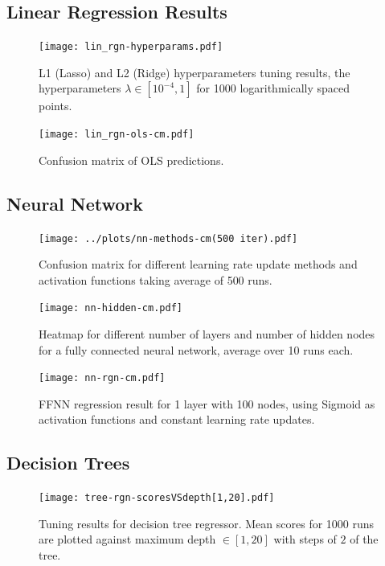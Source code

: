 \documentclass[english,notitlepage,reprint,nofootinbib]{revtex4-1}
\begin{document}
\subsection{Linear Regression Results}

\begin{figure}[H]
	\centering
	\texttt{[image: lin\_rgn-hyperparams.pdf]}
	\caption{L1 (Lasso) and L2 (Ridge) hyperparameters tuning results, the hyperparameters $ \lambda \in [10^{-4}, 1]$ for 1000 logarithmically spaced points.}
	\label{fig:lintune}
\end{figure}

\begin{figure}[H]
	\centering
	\texttt{[image: lin\_rgn-ols-cm.pdf]}
	\caption{Confusion matrix of OLS predictions.}
	\label{fig:olscm}
\end{figure}


\subsection{Neural Network}
\begin{figure}[H]
	\centering
	\texttt{[image: ../plots/nn-methods-cm(500 iter).pdf]}
	\caption{Confusion matrix for different learning rate update methods and activation functions taking average of 500 runs.}
	\label{fig:nn-method}
\end{figure}

\begin{figure}[H]
	\centering
	\texttt{[image: nn-hidden-cm.pdf]}
	\caption{Heatmap for different number of layers and number of hidden nodes for a fully connected neural network, average over 10 runs each.}
	\label{fig:nn-hidden}
\end{figure}

\begin{figure}[H]
	\centering
	\texttt{[image: nn-rgn-cm.pdf]}
	\caption{FFNN regression result for 1 layer with 100 nodes, using Sigmoid as activation functions and constant learning rate updates.}
	\label{fig:nn-rgn-cm}
\end{figure}

\subsection{Decision Trees}

\begin{figure}[H]
	\centering
	\texttt{[image: tree-rgn-scoresVSdepth[1,20].pdf]}
	\caption{Tuning results for decision tree regressor. Mean scores for 1000 runs are plotted against maximum depth $ \in [1,20] $  with steps of $ 2 $  of the tree. }
	\label{fig:tree-rgn-tune}
\end{figure}
\end{document}
